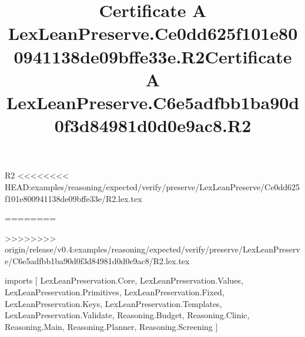 \begin{lexlean}{R2}
<<<<<<<< HEAD:examples/reasoning/expected/verify/preserve/LexLeanPreserve/Ce0dd625f101e800941138de09bffe33e/R2.lex.tex
\title{Certificate A LexLeanPreserve.Ce0dd625f101e800941138de09bffe33e.R2}
========
\title{Certificate A LexLeanPreserve.C6e5adfbb1ba90d0f3d84981d0d0e9ac8.R2}
>>>>>>>> origin/release/v0.4:examples/reasoning/expected/verify/preserve/LexLeanPreserve/C6e5adfbb1ba90d0f3d84981d0d0e9ac8/R2.lex.tex
\begin{coremodule}
imports [
  LexLeanPreservation.Core,
  LexLeanPreservation.Values,
  LexLeanPreservation.Primitives,
  LexLeanPreservation.Fixed,
  LexLeanPreservation.Keys,
  LexLeanPreservation.Templates,
  LexLeanPreservation.Validate,
  Reasoning.Budget,
  Reasoning.Clinic,
  Reasoning.Main,
  Reasoning.Planner,
  Reasoning.Screening
]


\end{coremodule}
\end{lexlean}
